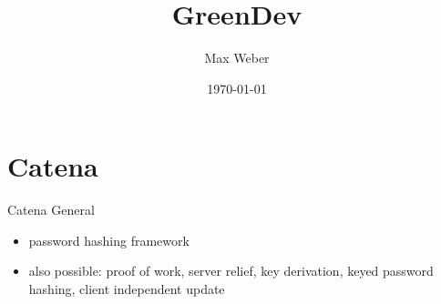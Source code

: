 \documentclass[11pt,aspectratio=169]{beamer}
\title[Green Development]{GreenDev}
\author[M. Weber]{Max Weber}
\institute[Bauhaus-Universität Weimar]{}
\date[\today]{\today}
\begin{document}

\maketitle


\section{Catena}

\begin{frame}{Catena General}
  \begin{itemize}
    \item password hashing framework
    \item also possible: proof of work, server relief, key derivation, keyed password hashing, client independent update
  \end{itemize}
\end{frame}
\end{document}
